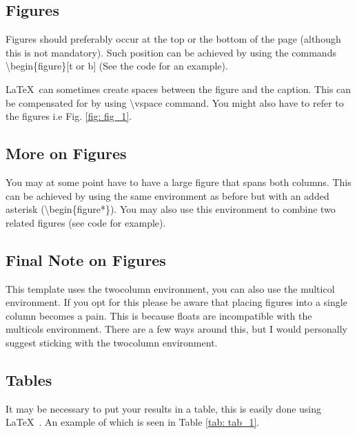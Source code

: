 \documentclass[a4paper,twocolumn,12pt, notitlepage]{article}
\begin{document}
\subsection{Figures}
Figures should preferably occur at the top or the bottom of the page (although this is not mandatory). Such position can be achieved by using the commands \textbackslash begin\{figure\}[t or b] (See the code for an example).  


\LaTeX\ can sometimes create spaces between the figure and the caption. This can be compensated for by using \textbackslash vspace command. You might also have to refer to the figures i.e Fig. \ref{fig: fig_1}.

\vspace{-5mm}

\subsection{More on Figures}
You may at some point have to have a large figure that spans both columns. This can be achieved by using the same environment as before but with an added asterisk (\textbackslash begin\{figure*\}). You may also use this environment to combine two related figures (see code for example).

\subsection{Final Note on Figures}
This template uses the twocolumn environment, you can also use the multicol environment. If you opt for this please be aware that placing figures into a single column becomes a pain. This is because floats are incompatible with the multicols environment. There are a few ways around this, but I would personally suggest sticking with the twocolumn environment.

\subsection{Tables}
\label{table}
It may be necessary to put your results in a table, this is easily done using \LaTeX\ . An example of which is seen in Table \ref{tab: tab_1}.
\end{document}
